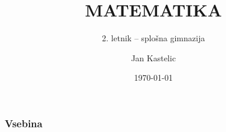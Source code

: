\documentclass[1pt, aspectratio=169,t]{beamer}
\title{MATEMATIKA}
\subtitle{2. letnik -- splošna gimnazija}
\date{\today}
\author{Jan Kastelic}
\institute[GAA]{Gimnazija Antona Aškerca, \\ Šolski center Ljubljana}
\begin{document}
\begin{frame}
	\titlepage
\end{frame}
	

\begin{frame}
	\frametitle{Vsebina}
	\tableofcontents[hideallsubsections]
\end{frame}
	
% 
% 
% 
% 
% 
% 
% 

% 
% 
% 
\end{document}
